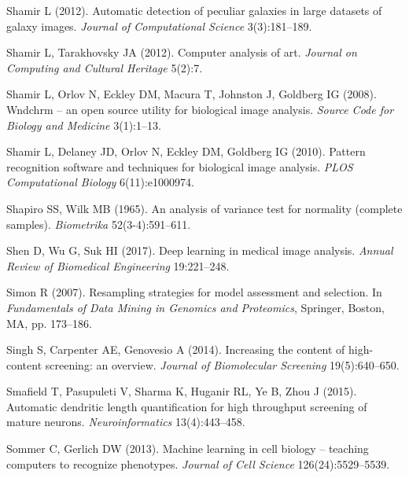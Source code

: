 \begin{thebibliography}{110}
Shamir L (2012). Automatic detection of peculiar galaxies in large datasets of
  galaxy images. \emph{Journal of Computational Science} 3(3):181--189.

Shamir L, Tarakhovsky JA (2012). Computer analysis of art. \emph{Journal on
  Computing and Cultural Heritage} 5(2):7.

Shamir L, Orlov N, Eckley DM, Macura T, Johnston J, Goldberg IG (2008). Wndchrm
  -- an open source utility for biological image analysis. \emph{Source Code
  for Biology and Medicine} 3(1):1--13.

Shamir L, Delaney JD, Orlov N, Eckley DM, Goldberg IG (2010). Pattern
  recognition software and techniques for biological image analysis. \emph{PLOS
  Computational Biology} 6(11):e1000974.

Shapiro SS, Wilk MB (1965). An analysis of variance test for normality
  (complete samples). \emph{Biometrika} 52(3-4):591--611.

Shen D, Wu G, Suk HI (2017). Deep learning in medical image analysis.
  \emph{Annual Review of Biomedical Engineering} 19:221--248.

Simon R (2007).
\newblock Resampling strategies for model assessment and selection. In
  \emph{Fundamentals of Data Mining in Genomics and Proteomics}, Springer,
  Boston, MA, pp. 173--186.

Singh S, Carpenter AE, Genovesio A (2014). Increasing the content of
  high-content screening: an overview. \emph{Journal of Biomolecular Screening}
  19(5):640--650.

Smafield T, Pasupuleti V, Sharma K, Huganir RL, Ye B, Zhou J (2015). Automatic
  dendritic length quantification for high throughput screening of mature
  neurons. \emph{Neuroinformatics} 13(4):443--458.

Sommer C, Gerlich DW (2013). Machine learning in cell biology -- teaching
  computers to recognize phenotypes. \emph{Journal of Cell Science}
  126(24):5529--5539.


\end{thebibliography}
